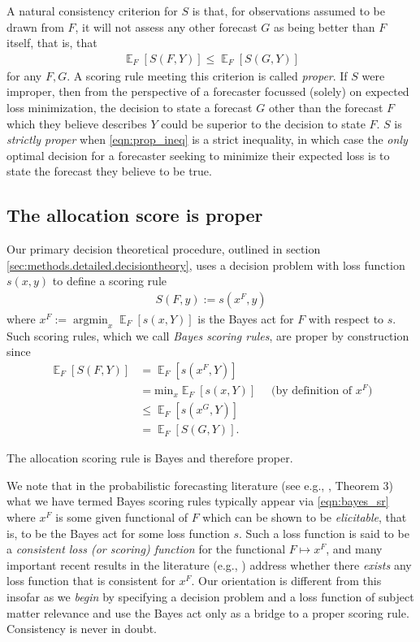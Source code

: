 \documentclass{article}\usepackage[]{graphicx}\usepackage[]{xcolor}
\DeclareMathOperator*{\argmin}{argmin}
\DeclareMathOperator{\Ex}{\mathbb{E}}
\begin{document}
A natural consistency criterion for $S$ is that, for observations assumed to be drawn from $F$, it will not assess any
other forecast $G$ as being better than $F$ itself, that is, that
\begin{align}
\Ex_F [S(F, Y)] \leq \Ex_F [S(G, Y)] \label{eqn:prop_ineq}
\end{align}
for any $F,G$. A scoring rule meeting this criterion is called \emph{proper}. If $S$ were improper, then from the
perspective of a forecaster focussed (solely) on expected loss minimization, the decision to state a forecast $G$ other
than the forecast $F$ which they believe describes $Y$ could be superior to the decision to state $F$. $S$ is
\emph{strictly proper} when \eqref{eqn:prop_ineq} is a strict inequality, in which case the \emph{only} optimal decision
for a forecaster seeking to minimize their expected loss is to state the forecast they believe to be true.

\subsection{The allocation score is proper}
\label{sec:alloscore_proper}

Our primary decision theoretical procedure, outlined in section \ref{sec:methods.detailed.decisiontheory},
uses a decision problem with loss function $s(x,y)$ to define a scoring rule
\begin{align}
S(F,y) := s(x^F,y) \label{eqn:bayes_sr}
\end{align}
where $x^F := \argmin_{x} \Ex_F[s(x,Y)]$ is the Bayes act for $F$ with respect to $s$.
Such scoring rules, which we call \emph{Bayes scoring rules},
are proper by construction since
\begin{align}
\Ex_F [S(F, Y)] &= \Ex_F [ s(x^F, Y) ] \nonumber \\
 &= \mathrm{min}_{x} \Ex_F [ s(x, Y) ] \quad \text{ (by definition of $x^F$)} \\
 &\leq \Ex_F [ s(x^G, Y) ] \label{eqn:dt_proper_key} \\
 &= \Ex_F [ S(G, Y)]. \nonumber
\end{align}

The allocation scoring rule is Bayes and therefore proper.

We note that in the probabilistic forecasting literature (see e.g., \cite{gneiting2011making}, Theorem 3) what we have
termed Bayes scoring rules typically appear via \eqref{eqn:bayes_sr} where $x^F$ is some given functional of $F$ which
can be shown to be \emph{elicitable}, that is, to be the Bayes act for some loss function $s$. Such a loss function is
said to be a \emph{consistent loss (or scoring) function} for the functional $F \mapsto x^F$, and many important recent
results in the literature (e.g., \cite{fisslerziegel2016consistency}) address whether there \emph{exists} any loss
function that is consistent for $x^F$. Our orientation is different from this insofar as we \emph{begin} by specifying a
decision problem and a loss function of subject matter relevance and use the Bayes act only as a bridge to a proper
scoring rule.  Consistency is never in doubt.
\end{document}
